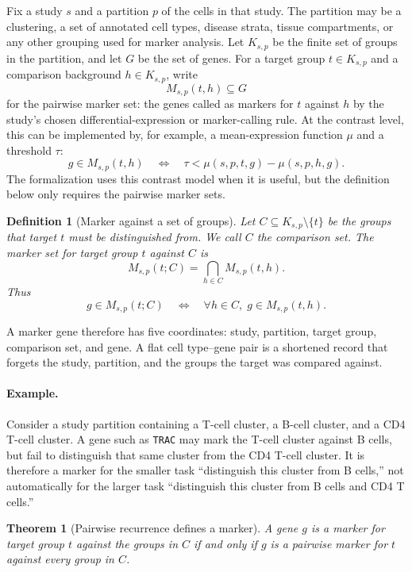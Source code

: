 \documentclass{article}
\newtheorem{definition}{Definition}
\newtheorem{theorem}{Theorem}
\begin{document}
Fix a study $s$ and a partition $p$ of the cells in that study. The partition may be a clustering, a set of annotated cell types, disease strata, tissue compartments, or any other grouping used for marker analysis. Let $K_{s,p}$ be the finite set of groups in the partition, and let $G$ be the set of genes. For a target group $t\in K_{s,p}$ and a comparison background $h\in K_{s,p}$, write
\[
  M_{s,p}(t,h)\subseteq G
\]
for the pairwise marker set: the genes called as markers for $t$ against $h$ by the study's chosen differential-expression or marker-calling rule. At the contrast level, this can be implemented by, for example, a mean-expression function $\mu$ and a threshold $\tau$:
\[
  g\in M_{s,p}(t,h)
  \quad\Longleftrightarrow\quad
  \tau < \mu(s,p,t,g)-\mu(s,p,h,g).
\]
The formalization uses this contrast model when it is useful, but the definition below only requires the pairwise marker sets.

\begin{definition}[Marker against a set of groups]\label{def:comparison-family-marker}
Let $C\subseteq K_{s,p}\setminus\{t\}$ be the groups that target $t$ must be distinguished from. We call $C$ the comparison set. The marker set for target group $t$ against $C$ is
\[
  M_{s,p}(t;C)=\bigcap_{h\in C}M_{s,p}(t,h).
\]
Thus
\[
  g\in M_{s,p}(t;C)
  \quad\Longleftrightarrow\quad
  \forall h\in C,\; g\in M_{s,p}(t,h).
\]
\end{definition}

A marker gene therefore has five coordinates: study, partition, target group, comparison set, and gene. A flat cell type--gene pair is a shortened record that forgets the study, partition, and the groups the target was compared against.

\paragraph{Example.}
Consider a study partition containing a T-cell cluster, a B-cell cluster, and a CD4 T-cell cluster. A gene such as \texttt{TRAC} may mark the T-cell cluster against B cells, but fail to distinguish that same cluster from the CD4 T-cell cluster. It is therefore a marker for the smaller task ``distinguish this cluster from B cells,'' not automatically for the larger task ``distinguish this cluster from B cells and CD4 T cells.''

\begin{theorem}[Pairwise recurrence defines a marker]\label{thm:pairwise-recurrence-marker}
A gene $g$ is a marker for target group $t$ against the groups in $C$ if and only if $g$ is a pairwise marker for $t$ against every group in $C$.
\end{theorem}
\end{document}
